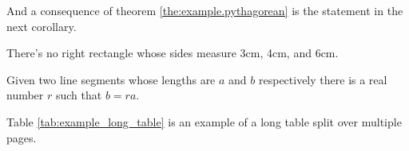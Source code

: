 And a consequence of theorem \ref{the:example.pythagorean} is the statement in the next 
corollary.

\begin{corollary}
	There's no right rectangle whose sides measure 3cm, 4cm, and 6cm.
\end{corollary}

\begin{lemma}
	Given two line segments whose lengths are \(a\) and \(b\) respectively there is a 
	real number \(r\) such that \(b=ra\).
\end{lemma}


\lipsum[7]

\vspace{16mm}

Table \ref{tab:example_long_table} is an example of a long table split over multiple pages.

\vspace{10mm}

